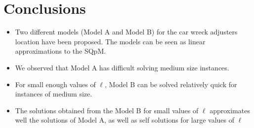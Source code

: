 \chapter{Conclusions}
\label{ch:Conclusions}
\begin{itemize}
\item Two different models (Model A and Model B)
  for the car wreck adjusters location have been proposed. 
  The models can be seen as linear approximations to the SQpM.
\item We observed that Model A
  has difficult solving medium size instances.
\item For small enough values of $\ell$,
  Model B can be solved relatively quick
  for instances of medium size.
\item The solutions obtained from the Model B
  for small values of $\ell$
  approximates well the solutions of Model A,
  as well as self solutions for large values of $\ell$
\end{itemize}

